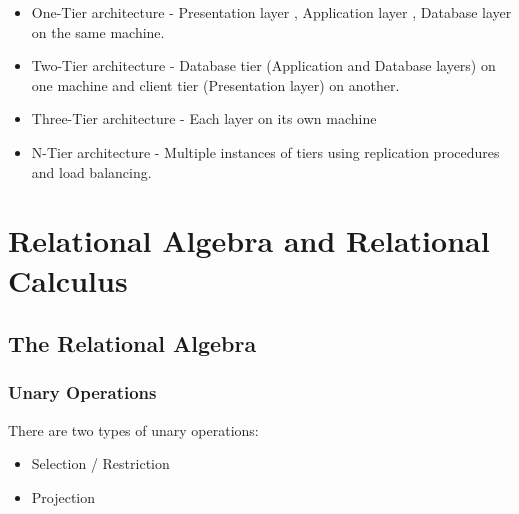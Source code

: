 \documentclass[12pt letter]{report}
\begin{document}




\begin{itemize}
  \item One-Tier architecture -  Presentation layer , Application layer , Database layer on the same machine.
  \item  Two-Tier architecture - Database tier (Application and Database layers) on one machine and client tier
        (Presentation layer) on another.
  \item Three-Tier architecture - Each layer on its own machine
  \item N-Tier architecture - Multiple instances of tiers using replication procedures and load balancing.
\end{itemize}


\chapter{Relational Algebra and Relational Calculus}

\section{The Relational Algebra}



\subsection{Unary Operations}


There are two types of unary operations:
\begin{itemize}
  \item  Selection / Restriction
  \item Projection
\end{itemize}
\end{document}
